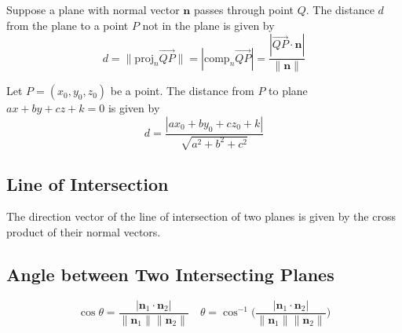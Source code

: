 \documentclass{article}
\begin{document}
Suppose a plane with normal vector $\mathbf{n}$ passes through point $Q$. The distance $d$ from the plane to a point $P$ not in the plane is given by
\[d=\|\text{proj}_n\overrightarrow{QP}\|=|\text{comp}_n\overrightarrow{QP}|=\frac{|\overrightarrow{QP}\cdot\mathbf{n}|}{\|\mathbf{n}\|}\]

Let $P = (x_0, y_0, z_0)$ be a point. The distance from $P$ to plane $ax+by+cz+k=0$ is given by
\[d=\frac{|ax_0 + by_0 + cz_0 + k|}{\sqrt{a^2 + b^2 + c^2}}\]

\subsection*{Line of Intersection}

The direction vector of the line of intersection of two planes is given by the cross product of their normal vectors.

\subsection*{Angle between Two Intersecting Planes}

\[\cos\theta = \frac{|\mathbf{n}_1\cdot\mathbf{n}_2|}{\|\mathbf{n}_1\|\|\mathbf{n}_2\|}\quad \theta = \cos^{-1}\Bigg(\frac{|\mathbf{n}_1\cdot\mathbf{n}_2|}{\|\mathbf{n}_1\|\|\mathbf{n}_2\|}\Bigg)\]
\end{document}
